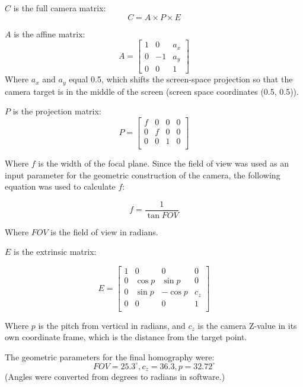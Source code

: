 \documentclass{article}
\begin{document}
	
$C$ is the full camera matrix:
\begin{equation}
	C = A \times P \times E
\end{equation}

$A$ is the affine matrix:
\begin{equation}
	A = \begin{bmatrix}
		1 & 0 & a_x \\
		0 & -1 & a_y \\
		0 & 0 & 1
	\end{bmatrix}
\end{equation}
Where $a_x$ and $a_y$ equal 0.5, which shifts the screen-space projection so that the camera target is in the middle of the screen (screen space coordinates (0.5, 0.5)).
	
$P$ is the projection matrix:
\begin{equation}
	P = \begin{bmatrix}
		f & 0 & 0 & 0 \\
		0 & f & 0 & 0 \\
		0 & 0 & 1 & 0 \\
	\end{bmatrix}
\end{equation}

Where $f$ is the width of the focal plane.  Since the field of view was used as an input parameter for the geometric construction of the camera, the following equation was used to calculate $f$:

\begin{equation}
	f = \frac{1}{\tan FOV}
\end{equation}

Where $FOV$ is the field of view in radians.

$E$ is the extrinsic matrix:

\begin{equation}
	E = \begin{bmatrix}
		1 & 0 & 0 & 0 \\
		0 & \cos p & \sin p & 0 \\
		0 & \sin p & -\cos p & c_z \\
		0 & 0 & 0 & 1 \\
	\end{bmatrix}
\end{equation}

Where $p$ is the pitch from vertical in radians, and $c_z$ is the camera Z-value in its own coordinate frame, which is the distance from the target point.

The geometric parameters for the final homography were: $$FOV=25.3^\circ, c_z = 36.3, p = 32.72^\circ$$  (Angles were converted from degrees to radians in software.)
\end{document}
